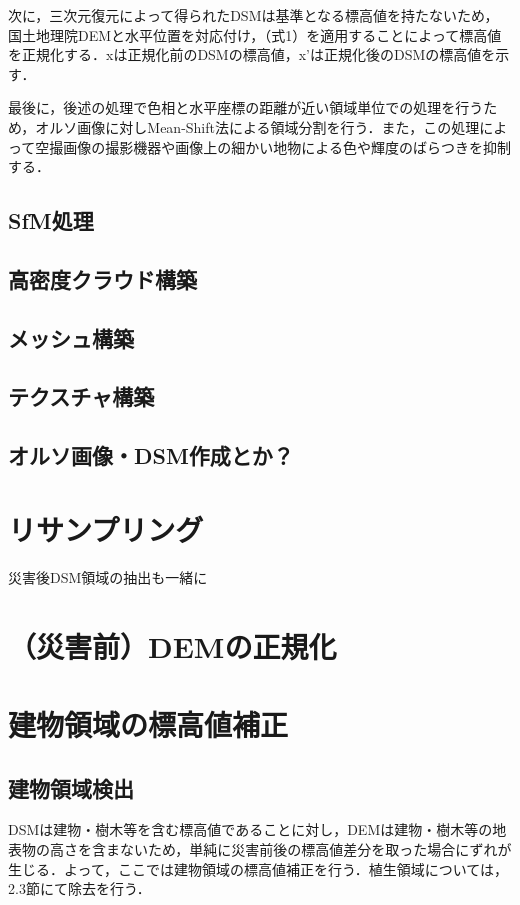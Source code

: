     次に，三次元復元によって得られたDSMは基準となる標高値を持たないため，国土地理院DEMと水平位置を対応付け，（式1）を適用することによって標高値を正規化する．xは正規化前のDSMの標高値，x’は正規化後のDSMの標高値を示す．
    
    最後に，後述の処理で色相と水平座標の距離が近い領域単位での処理を行うため，オルソ画像に対しMean-Shift法\cite{論文手法2}による領域分割を行う．また，この処理によって空撮画像の撮影機器や画像上の細かい地物による色や輝度のばらつきを抑制する．


    \subsection{SfM処理}
    \subsection{高密度クラウド構築}
    \subsection{メッシュ構築}
    \subsection{テクスチャ構築}
    \subsection{オルソ画像・DSM作成とか？}
    

  \section{リサンプリング}
  災害後DSM領域の抽出も一緒に


  \section{（災害前）DEMの正規化}
  
  \section{建物領域の標高値補正}
    \subsection{建物領域検出}
      DSMは建物・樹木等を含む標高値であることに対し，DEMは建物・樹木等の地表物の高さを含まないため，単純に災害前後の標高値差分を取った場合にずれが生じる．よって，ここでは建物領域の標高値補正を行う．植生領域については，2.3節にて除去を行う．
  
